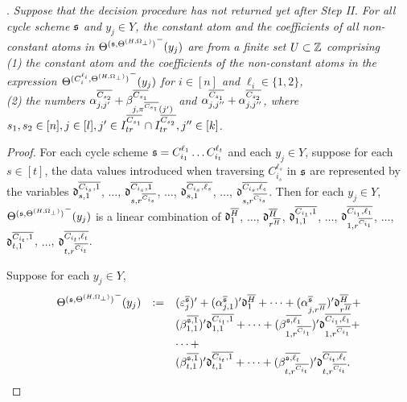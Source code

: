 \begin{appendix}
{.
{\it 
Suppose that the decision procedure has not returned yet after Step II. 
For all cycle scheme ${\mathfrak{s} }$ and $y_j \in Y$, the constant atom and the coefficients of all non-constant atoms in ${\Theta^{({\mathfrak{s} }, \Theta^{(H,\Omega_\bot)})}}^-(y_j)$ are from a finite set $U \subset {\mathbb{Z} }$ comprising \\ (1)
the constant atom and the coefficients of the non-constant atoms in the expression ${\Theta^{(C^{\ell_i}_{i}, \Theta^{(H,\Omega_\bot)})}}^-(y_j)$ for $i\in [n]$ and $\ell_i \in \{1,2\}$,\smallskip\\(2) the numbers $\alpha^{\overline{C_{s_2}}}_{j,j'} + \beta^{\overline{C_{s_1}}}_{j,\pi^{\overline{C_{s_1}}}(j')}$ and $\alpha^{\overline{C_{s_1}}}_{j, j''} + \alpha^{\overline{C_{s_2}}}_{j,j''}$, where  $s_1,s_2 \in [n], j\in[l],j' \in I^{\overline{C_{s_1}}}_{tr} \cap I^{\overline{C_{s_2}}}_{tr},  j'' \in [k]$. 
}

\begin{proof}
For each cycle scheme ${\mathfrak{s} }=C^{\ell_1}_{i_1} \dots C^{\ell_t}_{i_t}$ and each $y_j \in Y$, suppose for each $s\in [t]$, the data values introduced when traversing $C_{i_s}^{\ell_s}$ in ${\mathfrak{s} }$ are represented by the variables $\mathfrak{d}^{\overline{C_{i_s} , 1}}_{s,1}$, $\dots$, $\mathfrak{d}^{\overline{C_{i_s} , 1}}_{s,r^{\overline{C_{i_s}}}}$, $\dots$, $\mathfrak{d}^{\overline{C_{i_s} , \ell_s}}_{s,1}$, $\dots$, $\mathfrak{d}^{\overline{C_{i_s} , \ell_s}}_{s,r^{\overline{C_{i_s}}}}$. Then for each $y_j \in Y$,
 ${\Theta^{({\mathfrak{s} },\Theta^{(H,\Omega_\bot)})}}^-(y_j)$ is a linear combination of $\mathfrak{d}^{\overline{H}}_1$, $\dots$, $\mathfrak{d}^{\overline{H}}_{r^{\overline{H}}}$, $\mathfrak{d}^{\overline{C_{i_1} , 1}}_{1,1}$, $\dots$, $\mathfrak{d}^{\overline{C_{i_1} , \ell_1}}_{1,r^{\overline{C_{i_1}}}}$, $\dots$, $\mathfrak{d}^{\overline{C_{i_t} , 1}}_{t,1}$, $\dots$, $\mathfrak{d}^{\overline{C_{i_t} , \ell_t}}_{t, r^{\overline{C_{i_t}}}}$. 

Suppose for each $y_j \in Y$,
\[
\begin{array}{l cl }
{\Theta^{({\mathfrak{s} },\Theta^{(H,\Omega_\bot)})}}^-(y_j) &:= & (\varepsilon^{\overline{{\mathfrak{s} }}}_{j})'  + (\alpha^{\overline{{\mathfrak{s} }}}_{j,1})' \mathfrak{d}^{\overline{H}}_1 + \dots + (\alpha^{\overline{{\mathfrak{s} }}}_{j,r^{\overline{H}}})' \mathfrak{d}^{\overline{H}}_{r^{\overline{H}}} + \\
& & (\beta^{\overline{{\mathfrak{s} },1}}_{1,1})' \mathfrak{d}^{\overline{C_{i_1},1}}_{1,1}  + \dots + (\beta^{\overline{{\mathfrak{s} },\ell_1}}_{1,r^{\overline{C_{i_1}}}})' \mathfrak{d}^{\overline{C_{i_1},\ell_1}}_{1,r^{\overline{C_{i_1}}}}  +  \\
& & \dots + \\
& & (\beta^{\overline{{\mathfrak{s} },1}}_{t,1})' \mathfrak{d}^{\overline{C_{i_{t}},1}}_{t,1} + \dots + (\beta^{\overline{{\mathfrak{s} },\ell_{t}}}_{t,r^{\overline{C_{i_{t}}}}})' \mathfrak{d}^{\overline{C_{i_{t}},\ell_{t}}}_{t, r^{\overline{C_{i_{t}}}}}.
\end{array}
\]


\end{proof}}
\end{appendix}
